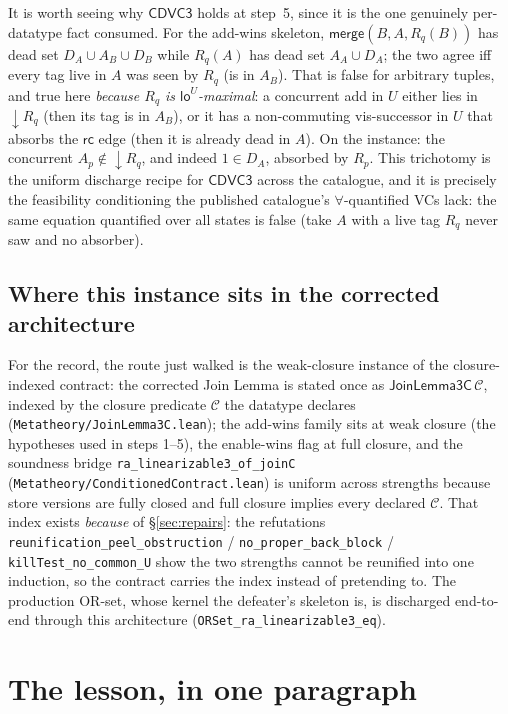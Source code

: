 \documentclass[11pt]{article}
\newcommand{\rcrel}{\mathsf{rc}}
\newcommand{\mergeL}{\mathsf{merge}}
\newcommand{\loE}[1]{\mathsf{lo}^{#1}}
\newcommand{\dow}[1]{{\downarrow}#1}
\newcommand{\cd}{\mathsf{CDVC3}}
\newcommand{\lean}[1]{\texttt{#1}}
\newcommand{\Ap}{A_p}
\newcommand{\Rp}{R_p}
\newcommand{\Rq}{R_q}
\begin{document}
It is worth seeing why $\cd$ holds at step~5, since it is the one
genuinely per-datatype fact consumed. For the add-wins skeleton,
$\mergeL(B, A, \Rq(B))$ has dead set
$D_A \cup A_B \cup D_B$ while $\Rq(A)$ has dead set $A_A \cup D_A$; the
two agree iff every tag live in $A$ was seen by $\Rq$ (is in $A_B$).
That is false for arbitrary tuples, and true here \emph{because $\Rq$
is $\loE{U}$-maximal}: a concurrent add in $U$ either lies in
$\dow{\Rq}$ (then its tag is in $A_B$), or it has a non-commuting
vis-successor in $U$ that absorbs the $\rcrel$ edge (then it is
already dead in $A$). On the instance: the concurrent $\Ap \notin
\dow{\Rq}$, and indeed $1 \in D_A$, absorbed by $\Rp$. This trichotomy
is the uniform discharge recipe for $\cd$ across the catalogue, and it
is precisely the feasibility conditioning the published catalogue's
$\forall$-quantified VCs lack: the same equation quantified over all
states is false (take $A$ with a live tag $\Rq$ never saw and no
absorber).

\subsection{Where this instance sits in the corrected architecture}

For the record, the route just walked is the weak-closure instance of
the closure-indexed contract: the corrected Join Lemma is stated once
as $\mathsf{JoinLemma3C}\,\mathcal{C}$, indexed by the closure
predicate $\mathcal{C}$ the datatype declares
(\lean{Metatheory/JoinLemma3C.lean}); the add-wins family sits at weak
closure (the hypotheses used in steps 1--5), the enable-wins flag at
full closure, and the soundness bridge
\lean{ra\_linearizable3\_of\_joinC}
(\lean{Metatheory/ConditionedContract.lean}) is uniform across
strengths because store versions are fully closed and full closure
implies every declared $\mathcal{C}$. That index exists \emph{because}
of \S\ref{sec:repairs}: the refutations
\lean{reunification\_peel\_obstruction} /
\lean{no\_proper\_back\_block} / \lean{killTest\_no\_common\_U} show
the two strengths cannot be reunified into one induction, so the
contract carries the index instead of pretending to. The production
OR-set, whose kernel the defeater's skeleton is, is discharged
end-to-end through this architecture
(\lean{ORSet\_ra\_linearizable3\_eq}).

\section{The lesson, in one paragraph}
\label{sec:lesson}
\end{document}

